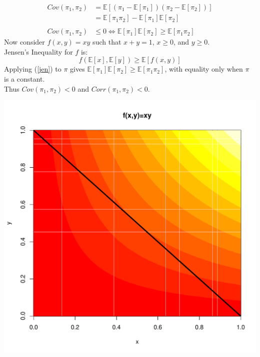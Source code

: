 \documentclass[ xcolor = pdftex, dvipsnames, table ]{beamer}
\begin{document}
%
\begin{frame}
	\begin{minipage}{0.69\textwidth}
	\begin{align*}
	Cov(\pi_{1}, \pi_{2}) &= \mathbb{E}[(\pi_{1}-\mathbb{E}[\pi_{1}])(\pi_{2}-\mathbb{E}[\pi_{2}])] \nonumber\\ 
        &= \mathbb{E}[\pi_{1}\pi_{2}] - \mathbb{E}[\pi_{1}]\mathbb{E}[\pi_{2}] \nonumber\\\nonumber\\
        Cov(\pi_{1}, \pi_{2}) &\le0 \iff \mathbb{E}[\pi_{1}]\mathbb{E}[\pi_{2}] \ge \mathbb{E}[\pi_{1}\pi_{2}]
	\end{align*}
	Now consider $f(x, y)=xy$ such that $x+y=1$, $x\ge0$, and $y\ge0$.\\
	Jensen's Inequality for $f$ is: 
	\begin{equation}
	f(\mathbb{E}[x], \mathbb{E}[y]) \ge \mathbb{E}[f(x, y)]
	\label{jen}
	\end{equation}
	Applying (\ref{jen}) to $\pi$ gives $\mathbb{E}[\pi_{1}]\mathbb{E}[\pi_{2}] \ge \mathbb{E}[\pi_{1}\pi_{2}]$, 
	with equality only when $\pi$ is a constant.
	\\
	Thus $Cov(\pi_{1}, \pi_{2}) < 0$ and $Corr(\pi_{1}, \pi_{2}) < 0$.
	\end{minipage}
	\begin{minipage}{0.29\textwidth}
	\hspace*{0.5cm}
	\includegraphics[width=\textwidth]{./pictures/heatPlot.pdf}\\

\end{minipage}
\end{frame}
\end{document}

